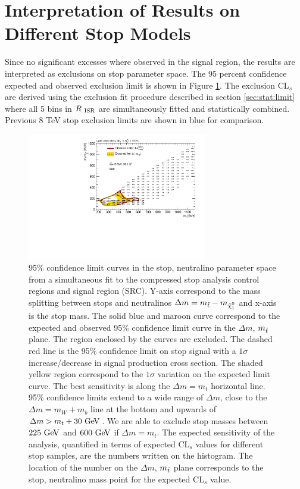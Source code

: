\section{Interpretation of Results on Different Stop Models}
\label{chap:Interpretation}

\indent Since no significant excesses where observed in the signal region, the results are interpreted as exclusions on stop parameter space.  The 95 percent confidence expected and observed exclusion limit is shown in Figure \ref{figure.exclusion.SRC}.  The exclusion CL$_s$ are derived using the exclusion fit procedure described in section \ref{sec:stat:limit} where all 5 bins in $R_{~\mathrm{ISR}}$ are simultaneously fitted and statistically combined. Previous 8 TeV stop exclusion limits are shown in blue for comparison. \\

\begin{figure}[h!]
	\begin{center}
		\includegraphics[width=0.70\textwidth, angle=270]{HistFitterStuff/SRC_exclusion.pdf}
		\caption[95\% confidence limit curves in the stop, neutralino parameter space for the compressed stop analysis]{ 95\% confidence limit curves in the stop, neutralino parameter space from a simultaneous fit to the compressed stop analysis control regions and signal region (SRC).  Y-axis correspond to the mass splitting between stops and neutralinos $\Delta m = m_{\stop} - m_{\ninoone}$ and x-axis is the stop mass.  The solid blue and maroon curve correspond to the expected and observed 95\% confidence limit curve in the $\Delta m$, $m_{\tilde{t}}$ plane.  The region enclosed by the curves are excluded.  The dashed red line is the 95\% confidence limit on stop signal with a $1\sigma$ increase/decrease in signal production cross section.  The shaded yellow region correspond to the $1\sigma$ variation on the expected limit curve.  The best sensitivity is along the $\Delta m = m_t$ horizontal line.  95\% confidence limits extend to a wide range of $\Delta m$, close to the $\Delta m = m_W + m_b $ line at the bottom and upwards of $\Delta m > m_t+30 \gev $.  We are able to exclude stop masses between $225 \gev$ and $600 \gev$ if $\Delta m = m_t$.  The expected sensitivity of the analysis, quantified in terms of expected CL$_s$ values for different stop samples, are the numbers written on the histogram.  The location of the number on the $\Delta m$, $m_{\tilde{t}}$ plane corresponds to the stop, neutralino mass point for the expected CL$_s$ value.  }
		\label{figure.exclusion.SRC}
	\end{center}
\end{figure}

